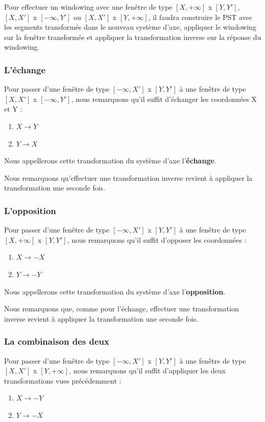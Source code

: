 \documentclass[10pt,a4paper]{article}
\begin{document}
Pour effectuer un windowing avec une fenêtre de type $[X, +\infty]$ x $[Y, Y']$, $[X, X']$ x $[-\infty, Y']$ ou $[X, X']$ x $[Y, +\infty]$, il faudra construire le PST avec les segments transformés dans le nouveau système d'axe, appliquer le windowing sur la fenêtre transformée et appliquer la transformation inverse sur la réponse du windowing.

\subsubsection{L'échange}
Pour passer d'une fenêtre de type $[-\infty, X']$ x $[Y, Y']$ à une fenêtre de type $[X, X']$ x $[-\infty, Y']$, nous remarquons qu'il suffit d'échanger les coordonnées X et Y :
\begin{enumerate}
	\item $X \rightarrow Y$
	\item $Y \rightarrow X$
\end{enumerate}

Nous appellerons cette transformation du système d'axe l'\textbf{échange}.

Nous remarquons qu'effectuer une transformation inverse revient à appliquer la transformation une seconde fois.

\subsubsection{L'opposition}
Pour passer d'une fenêtre de type $[-\infty, X']$ x $[Y, Y']$ à une fenêtre de type $[X, +\infty]$ x $[Y, Y']$, nous remarquons qu'il suffit d'opposer les coordonnées :
\begin{enumerate}
	\item $X \rightarrow -X$
	\item $Y \rightarrow -Y$
\end{enumerate}

Nous appellerons cette transformation du système d'axe l'\textbf{opposition}.

Nous remarquons que, comme pour l'échange, effectuer une transformation inverse revient à appliquer la transformation une seconde fois.

\subsubsection{La combinaison des deux}
Pour passer d'une fenêtre de type $[-\infty, X']$ x $[Y, Y']$ à une fenêtre de type $[X, X']$ x $[Y, +\infty]$, nous remarquons qu'il suffit d'appliquer les deux transformations vues précédemment :
\begin{enumerate}
	\item $X \rightarrow -Y$
	\item $Y \rightarrow -X$
\end{enumerate}
\end{document}

